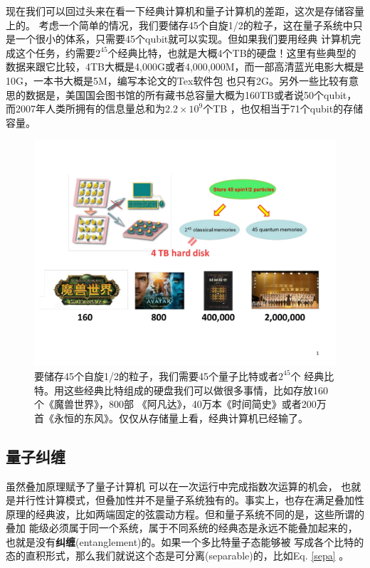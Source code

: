  现在我们可以回过头来在看一下经典计算机和量子计算机的差距，这次是存储容量上的。
 考虑一个简单的情况，我们要储存45个自旋1/2的粒子，这在量子系统中只是一个很小的体系，只需要45个qubit就可以实现。但如果我们要用经典
 计算机完成这个任务，约需要$2^{45}$个经典比特，也就是大概4个TB的硬盘！这里有些典型的数据来跟它比较，4TB大概是4,000G或者4,000,000M，而一部高清蓝光电影大概是10G，一本书大概是5M，编写本论文的Tex软件包
也只有2G。另外一些比较有意思的数据是，美国国会图书馆的所有藏书总容量大概为160TB或者说50个qubit，而2007年人类所拥有的信息量总和为$2.2\times 10^9$个TB
\cite{Hilbert}，也仅相当于71个qubit的存储容量。
 \begin{figure}[htbp]
            \begin{center}
              \includegraphics[width= 0.8\columnwidth]{figures/register.pdf}
              \caption{要储存45个自旋1/2的粒子，我们需要45个量子比特或者$2^{45}$个
              经典比特。用这些经典比特组成的硬盘我们可以做很多事情，比如存放160个《魔兽世界》，800部
              《阿凡达》，40万本《时间简史》或者200万首《永恒的东风》。仅仅从存储量上看，经典计算机已经输了。
              }
              \label{register}
            \end{center}
  \end{figure}

\subsection{量子纠缠}

虽然叠加原理赋予了量子计算机 可以在一次运行中完成指数次运算的机会， 也就是并行性计算模式，但叠加性并不是量子系统独有的。事实上，也存在满足叠加性原理的经典波，比如两端固定的弦震动方程。但和量子系统不同的是，这些所谓的叠加
能级必须属于同一个系统，属于不同系统的经典态是永远不能叠加起来的，也就是没有\textbf{纠缠}(entanglement)的。如果一个多比特量子态能够被
写成各个比特的态的直积形式，那么我们就说这个态是可分离(separable)的，比如Eq. \ref{sepa} 。

